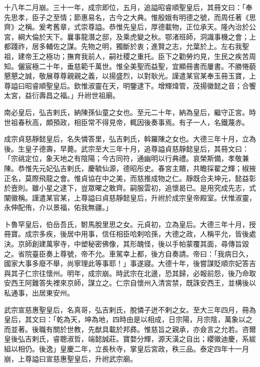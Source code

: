 \begin{pinyinscope}
 十八年二月崩。三十一年，成宗即位，五月，追謚昭睿順聖皇后，其冊文曰：「奉先思孝，臣子之至情；節惠易名，古今之大典。惟殷娥有明德之號，而周任著《思齊》之稱。爰考舊章，式崇尊謚。恭惟先皇后，厚德載物，正位承天。隆內治於公宮，綱大倫於天下。曩事龍潛之邸，及乘虎變之秋。鄂渚班師，洞識事機之會；上都踐祚，居多輔佐之謀。先物之明，獨斷於衷；進賢之志，允葉於上。左右我聖祖，建帝王之極功；撫育我前人，嗣社稷之重托。臣下之勸勞灼見，生民之疾苦周知。儷宸極二十年，垂慈範千萬世。惟全美聖而益聖，宜顯冊書而屢書。不勝惓藐懇懇之誠，敬展尊尊親親之義，以揚盛烈，以對耿光。謹遣某官某奉玉冊玉寶，上尊謚曰昭睿順聖皇后。欽惟淑靈在天，明鑒逮下。增輝煒管，茂揚徽懿之音；合饗太宮，益衍壽昌之福。」升祔世祖廟。



 南必皇后，弘吉剌氏，納陳孫仙童之女也。至元二十年，納為皇后，繼守正宮。時世祖春秋高，頗預政，相臣常不得見帝，輒因後奏事焉。有子一人，名鐵蔑赤。



 成宗貞慈靜懿皇后，名失憐答里，弘吉剌氏，斡羅陳之女也。大德三年十月，立為後。生皇子德壽，早薨。武宗至大三年十月，追尊謚貞慈靜懿皇后，其冊文曰：「宗祧定位，象天地之有陰陽；今古同符，通幽明以行典禮。哀榮斯備，孝敬兼陳。恭惟先元妃弘吉剌氏，慶毓仙源，德昭彤史。春宮主饋，共瞻採翟之輝；椒掖正名，莫際飛龍之會。惟貞協在中之美，而慈推成物之仁。靜既合夫坤元，懿益彰於壼則。雖小星之逮下，豈眾曜之敢齊。嗣服雲初，追懷曷已。是用究成先志，式闡徽稱。謹遣某官某，上尊謚曰貞慈靜懿皇后，升祔於成宗皇帝殿室。伏惟淑靈，永伸配侑，介以景福，佑我無疆。」



 卜魯罕皇后，伯岳吾氏，駙馬脫里思之女。元貞初，立為皇后。大德三年十月，授冊寶。成宗多疾，後居中用事，信任相臣哈剌哈孫，大德之政，人稱平允，皆後處決。京師創建萬寧寺，中塑秘密佛像，其形醜怪，後以手帕蒙覆其面，尋傳旨毀之。省院臺臣奏上尊號，帝不允。車駕幸上都，後方自奏請。帝曰：「我病日久，國家大事多廢不舉，尚寧理此等事耶！」事遂寢。大德十年，後嘗謀貶順宗妃答吉與其子仁宗往懷州。明年，成宗崩。時武宗在北邊，恐其歸，必報前怨，後乃命取安西王阿難答失裡來京師，謀立之。仁宗自懷州入清宮禁，既誅安西王，並構後以私通事，出居東安州。



 武宗宣慈惠聖皇后，名真哥，弘吉剌氏，脫憐子迸不剌之女。至大三年四月，冊為皇后，其文曰：「乾為天，坤為地，四時由是以相成，日宗陽，月宗陰，萬象以之而並著。後職有關於世教，先猷具載於邦彞。惟慈旨之親承，亦僉言之允若。咨爾皇後弘吉剌氏，睿聰淑哲，端懿誠莊。寶婺分輝，源天潢之自出；纓徽迪慶，系紱組以相仍。後逸」皇慶二年，立長秋寺，掌皇后宮政，秩三品。泰定四年十一月崩，上尊謚曰宣慈惠聖皇后，升祔武宗廟。




\end{pinyinscope}
